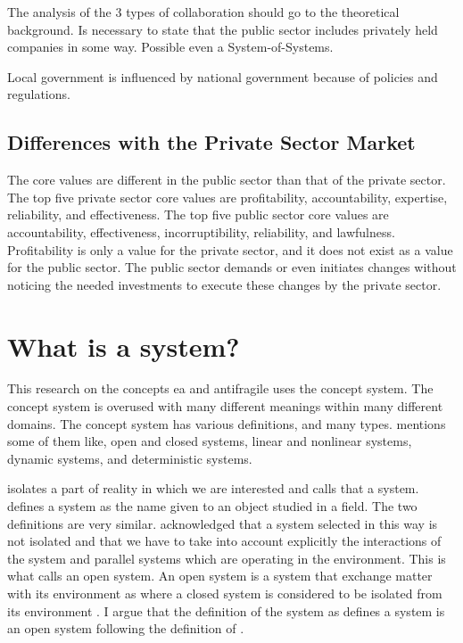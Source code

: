 \begin{remark}
	The analysis of the 3 types of collaboration should go to the theoretical background. Is necessary to state that the public sector includes privately held companies in some way. Possible even a System-of-Systems.
\end{remark}

\begin{remark}
	Local government is influenced by national government because of policies and regulations.
\end{remark}
\subsection{Differences with the Private Sector Market}
\label{sub:tbdifferenceprivatesector}

The core values are different in the public sector than that of the private sector. The top five private sector core values are profitability, accountability, expertise, reliability, and effectiveness. The top five public sector core values are accountability, effectiveness, incorruptibility, reliability, and lawfulness. \parencite{Wal2008} Profitability is only a value for the private sector, and it does not exist as a value for the public sector.  The public sector demands or even initiates changes without noticing the needed investments to execute these changes by the private sector.

\section{What is a system?}
\label{sec:tbsystem}

This research on the concepts \acrshort{ea} and \gls{antifragile} uses the concept system. The concept system is overused with many different meanings within many different \glspl{domain}. The concept system has various definitions, and many types. \textcite{Rickles2007} mentions some of them like, open and closed systems, linear and nonlinear systems, dynamic systems, and deterministic systems. 

\textcite[p. 13]{Mannaert2016} isolates a part of reality in which we are interested and calls that a system. \textcite[p. 933]{Rickles2007} defines a system as the name given to an object studied in a field. The two definitions are very similar. \textcite[p. 13-14]{Mannaert2016} acknowledged that a system selected in this way is not isolated and that we have to take into account explicitly the interactions of the system and parallel systems which are operating in the environment. This is what \textcite[p. 32]{Bertalanffy1968} calls an open system. An open system is a system that exchange matter with its environment \parencite[p.32]{Bertalanffy1968} as where a closed system is considered to be isolated from its environment \parencite[p. 39]{Bertalanffy1968}. I argue that the definition of the system as \textcite{Mannaert2016} defines a system is an open system following the definition of \parencite{Bertalanffy1968}.

